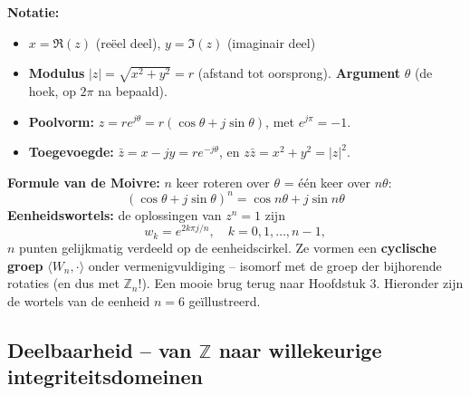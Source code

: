 \textbf{Notatie:}
\begin{itemize}
    \item $x = \Re(z)$ (reëel deel), $y=\Im(z)$ (imaginair deel)
    \item \textbf{Modulus} $|z| = \sqrt{x^2 + y^2} = r$ (afstand tot oorsprong). \textbf{Argument} $\theta$ (de hoek, op $2\pi$ na bepaald).
    \item \textbf{Poolvorm:} $z = re^{j\theta} = r(\cos \theta + j \sin \theta)$, met $e^{j\pi} = -1$.
    \item \textbf{Toegevoegde:} $\bar{z} = x - jy = re^{-j\theta}$, en $z\bar{z} = x^2 + y^2 = |z|^2$.
\end{itemize}
\begin{center}
    \begin{minipage}{0.43\textwidth}
        \centering
        \resizebox{\textwidth}{!}{%
            
        }
    \end{minipage}%
    \hfill
    \begin{minipage}{0.35\textwidth}
        \centering
        \resizebox{\textwidth}{!}{%
            
        }
    \end{minipage}
\end{center}
\textbf{Formule van de Moivre:} $n$ keer roteren over $\theta$ = één keer over $n\theta$:
\begin{equation*}
    (\cos \theta + j\sin \theta)^n = \cos n\theta + j\sin n\theta
\end{equation*}
\textbf{Eenheidswortels:} de oplossingen van $z^n=1$ zijn
\begin{equation*}
    w_k = e^{2k\pi j / n}, \quad k = 0,1,\dots,n-1,
\end{equation*}
$n$ punten gelijkmatig verdeeld op de eenheidscirkel. Ze vormen een \textbf{cyclische groep} $\langle W_n,\cdot \rangle$ onder vermenigvuldiging -- isomorf met de groep der bijhorende rotaties (en dus met $\mathbb{Z}_n$!). Een mooie brug terug naar Hoofdstuk 3. Hieronder zijn de wortels van de eenheid $n=6$ geïllustreerd.
\begin{center}
\resizebox{0.62\textwidth}{!}{%
    
}
\end{center}

\subsection{Deelbaarheid -- van \texorpdfstring{$\mathbb{Z}$}{Z} naar willekeurige integriteitsdomeinen}

